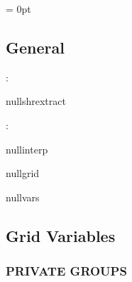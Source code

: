 \parskip = 0pt

\vspace{3mm} \subsection*{General}

: 

nullshrextract
\vspace{2mm}

: 

nullinterp

nullgrid

nullvars
\vspace{2mm}
\subsection*{Grid Variables}
\vspace{5mm}\subsubsection{PRIVATE GROUPS}

\vspace{5mm}

